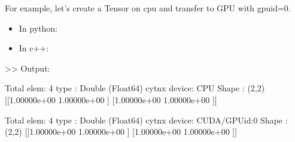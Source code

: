 \documentclass[letterpaper,10pt,english]{sphinxmanual}
\begin{document}
For example, let’s create a Tensor on cpu and transfer to GPU with gpu\sphinxhyphen{}id=0.
\begin{itemize}
\item {} 
In python:

\end{itemize}

\begin{sphinxVerbatim}[commandchars=\\\{\},numbers=left,firstnumber=1,stepnumber=1]
  \PYG{p}{[}\PYG{p}{]} 
\end{sphinxVerbatim}
\begin{itemize}
\item {} 
In c++:

\end{itemize}

\begin{sphinxVerbatim}[commandchars=\\\{\},numbers=left,firstnumber=1,stepnumber=1]
   \PYG{p}{[}\PYG{p}{]} 
    
    
\end{sphinxVerbatim}

\textgreater{}\textgreater{} Output:

\begin{sphinxVerbatim}[commandchars=\\\{\}]
Total elem: 4
type  : Double (Float64)
cytnx device: CPU
Shape : (2,2)
[[1.00000e+00 1.00000e+00 ]
 [1.00000e+00 1.00000e+00 ]]

Total elem: 4
type  : Double (Float64)
cytnx device: CUDA/GPU\PYGZhy{}id:0
Shape : (2,2)
[[1.00000e+00 1.00000e+00 ]
 [1.00000e+00 1.00000e+00 ]]
\end{sphinxVerbatim}
\end{document}
